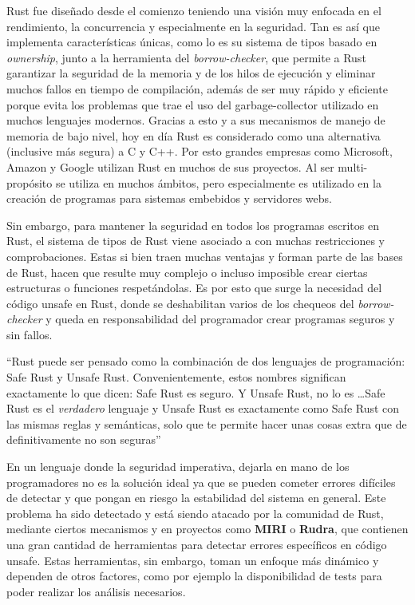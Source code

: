Rust fue diseñado desde el comienzo teniendo una visión muy enfocada en el rendimiento, la concurrencia y especialmente en la seguridad. Tan es así que implementa características únicas, como lo es su sistema de tipos basado en \textit{ownership}, junto a la herramienta del \textit{borrow-checker}, que permite a Rust garantizar la seguridad de la memoria y de los hilos de ejecución y eliminar muchos fallos en tiempo de compilación, además de ser muy rápido y eficiente porque evita los problemas que trae el uso del garbage-collector utilizado en muchos lenguajes modernos. Gracias a esto y a sus mecanismos de manejo de memoria de bajo nivel, hoy en día Rust es considerado como una alternativa (inclusive más segura) a C y C++. Por esto grandes empresas como Microsoft, Amazon y Google utilizan Rust en muchos de sus proyectos. Al ser multi-propósito se utiliza en muchos ámbitos, pero especialmente es utilizado en la creación de programas para sistemas embebidos y servidores webs.

Sin embargo, para mantener la seguridad en todos los programas escritos en Rust, el sistema de tipos de Rust viene asociado a con muchas restricciones y comprobaciones. Estas si bien traen muchas ventajas y forman parte de las bases de Rust, hacen que resulte muy complejo o incluso imposible crear ciertas estructuras o funciones respetándolas. Es por esto que surge la necesidad del código unsafe en Rust, donde se deshabilitan varios de los chequeos del \textit{borrow-checker} y queda en responsabilidad del programador crear programas seguros y sin fallos.

``Rust puede ser pensado como la combinación de dos lenguajes de programación: Safe Rust y Unsafe Rust. Convenientemente, estos nombres significan exactamente lo que dicen: Safe Rust es seguro. Y Unsafe Rust, no lo es \dots Safe Rust es el \textit{verdadero} lenguaje y Unsafe Rust es exactamente como Safe Rust con las mismas reglas y semánticas, solo que te permite hacer unas cosas extra que de definitivamente no son seguras'' \citep{rustonomicon}

En un lenguaje donde la seguridad imperativa, dejarla en mano de los programadores no es la solución ideal ya que se pueden cometer errores difíciles de detectar y que pongan en riesgo la estabilidad del sistema en general. Este problema ha sido detectado y está siendo atacado por la comunidad de Rust, mediante ciertos mecanismos y en proyectos como \textbf{MIRI} o \textbf{Rudra}, que contienen una gran cantidad de herramientas para detectar errores específicos en código unsafe. Estas herramientas, sin embargo, toman un enfoque más dinámico y dependen de otros factores, como por ejemplo la disponibilidad de tests para poder realizar los análisis necesarios.

